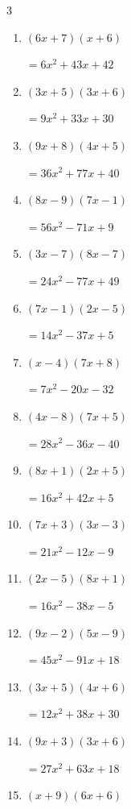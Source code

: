 \begin{multicols}{3}
\begin{enumerate}
        $=54x^{2}-57x+8$

\columnbreak %

  \item $(6x+7)(x+6)$

        $=6x^{2}+43x+42$

  \item $(3x+5)(3x+6)$

        $=9x^{2}+33x+30$

  \item $(9x+8)(4x+5)$

        $=36x^{2}+77x+40$

  \item $(8x-9)(7x-1)$

        $=56x^{2}-71x+9$

  \item $(3x-7)(8x-7)$

        $=24x^{2}-77x+49$

  \item $(7x-1)(2x-5)$

        $=14x^{2}-37x+5$

  \item $(x-4)(7x+8)$

        $=7x^{2}-20x-32$

  \item $(4x-8)(7x+5)$

        $=28x^{2}-36x-40$

  \item $(8x+1)(2x+5)$

        $=16x^{2}+42x+5$

  \item $(7x+3)(3x-3)$

        $=21x^{2}-12x-9$

  \item $(2x-5)(8x+1)$

        $=16x^{2}-38x-5$

  \item $(9x-2)(5x-9)$

        $=45x^{2}-91x+18$

  \item $(3x+5)(4x+6)$

        $=12x^{2}+38x+30$

  \item $(9x+3)(3x+6)$

        $=27x^{2}+63x+18$

  \item $(x+9)(6x+6)$


\end{enumerate}
\end{multicols}
